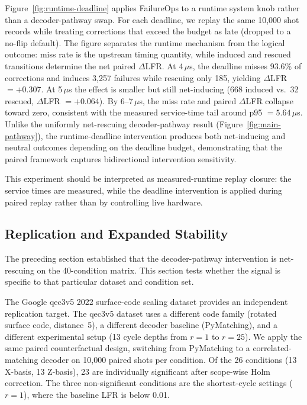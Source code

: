 Figure~\ref{fig:runtime-deadline} applies FailureOps to a runtime system knob rather than a decoder-pathway swap. For each deadline, we replay the same 10,000 shot records while treating corrections that exceed the budget as late (dropped to a no-flip default). The figure separates the runtime mechanism from the logical outcome: miss rate is the upstream timing quantity, while induced and rescued transitions determine the net paired $\Delta$LFR. At 4\,$\mu$s, the deadline misses 93.6\% of corrections and induces 3,257 failures while rescuing only 185, yielding $\Delta$LFR $= +0.307$. At 5\,$\mu$s the effect is smaller but still net-inducing (668 induced vs.\ 32 rescued, $\Delta$LFR $= +0.064$). By 6--7\,$\mu$s, the miss rate and paired $\Delta$LFR collapse toward zero, consistent with the measured service-time tail around p95 $= 5.64\,\mu$s. Unlike the uniformly net-rescuing decoder-pathway result (Figure~\ref{fig:main-pathway}), the runtime-deadline intervention produces both net-inducing and neutral outcomes depending on the deadline budget, demonstrating that the paired framework captures bidirectional intervention sensitivity.

This experiment should be interpreted as measured-runtime replay closure: the service times are measured, while the deadline intervention is applied during paired replay rather than by controlling live hardware.

\subsection{Replication and Expanded Stability}
\label{sec:replication}

The preceding section established that the decoder-pathway intervention is net-rescuing on the 40-condition matrix. This section tests whether the signal is specific to that particular dataset and condition set.

The Google qec3v5 2022 surface-code scaling dataset provides an independent replication target. The qec3v5 dataset uses a different code family (rotated surface code, distance~5), a different decoder baseline (PyMatching), and a different experimental setup (13 cycle depths from $r = 1$ to $r = 25$). We apply the same paired counterfactual design, switching from PyMatching to a correlated-matching decoder on 10,000 paired shots per condition. Of the 26 conditions (13 X-basis, 13 Z-basis), 23 are individually significant after scope-wise Holm correction. The three non-significant conditions are the shortest-cycle settings ($r = 1$), where the baseline LFR is below 0.01.

